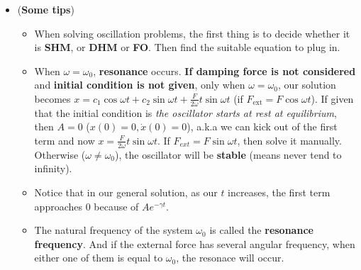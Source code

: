 \documentclass[10pt, landscape]{article}
\begin{document}
\begin{multicols}{4}
\begin{enumerate}
\begin{itemize}
        \item (\textbf{Some tips})
        \begin{itemize}
            \item When solving oscillation problems, the first thing is to decide whether it is \textbf{SHM}, or \textbf{DHM} or \textbf{FO}. Then find the suitable equation to plug in.
            \item When $\omega = \omega_0$, \textbf{resonance} occurs. \textbf{If damping force is not considered} and \textbf{initial condition is not given}, only when $\omega = \omega_0$, our solution becomes $x=c_1\cos \omega t+c_2 \sin\omega t + \frac{F}{2\omega}t\sin\omega t$ (if $F_{\text{ext}}=F\cos \omega t$). If given that the initial condition is \textit{the oscillator starts at rest at equilibrium}, then $A=0$ ($x(0)=0, \dot{x}(0)=0$), a.k.a we can kick out of the first term and now $x=\frac{F}{2\omega}t\sin\omega t$. If $F_{ext}=F\sin \omega t$, then solve it manually. \newline
            Otherwise ($\omega \neq \omega_0$), the oscillator will be \textbf{stable} (means never tend to infinity).
            \item Notice that in our general solution, as our $t$ increases, the first term approaches 0 because of $Ae^{-\gamma t}$.
            \item The natural frequency of the system $\omega_0$ is called the \textbf{resonance frequency}. And if the external force has several angular frequency, when either one of them is equal to $\omega_0$, the resonace will occur.
        \end{itemize}
    \end{itemize}
\end{enumerate}


\end{multicols}
\end{document}
